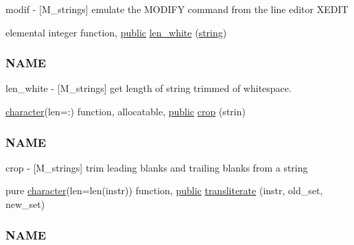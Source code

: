 \begin{DoxyCompactItemize}
\begin{DoxyCompactList}
modif -\/ \mbox{[}M\+\_\+strings\mbox{]} emulate the M\+O\+D\+I\+FY command from the line editor X\+E\+D\+IT \end{DoxyCompactList}\item 
elemental integer function, \hyperlink{M__stopwatch_83_8txt_a2f74811300c361e53b430611a7d1769f}{public} \hyperlink{namespacem__strings_aa1427d5dd673ff986236ba1732e693c1}{len\+\_\+white} (\hyperlink{what__overview_81_8txt_a74cb7e955273b9f9157b4f0c18a38849}{string})
\begin{DoxyCompactList}\small\item\em \subsubsection*{N\+A\+ME}

len\+\_\+white -\/ \mbox{[}M\+\_\+strings\mbox{]} get length of string trimmed of whitespace. \end{DoxyCompactList}\item 
\hyperlink{option__stopwatch_83_8txt_abd4b21fbbd175834027b5224bfe97e66}{character}(len=\+:) function, allocatable, \hyperlink{M__stopwatch_83_8txt_a2f74811300c361e53b430611a7d1769f}{public} \hyperlink{namespacem__strings_a7030d33ae9e65d8cf2e2cb9332ffdac0}{crop} (strin)
\begin{DoxyCompactList}\small\item\em \subsubsection*{N\+A\+ME}

crop -\/ \mbox{[}M\+\_\+strings\mbox{]} trim leading blanks and trailing blanks from a string \end{DoxyCompactList}\item 
pure \hyperlink{option__stopwatch_83_8txt_abd4b21fbbd175834027b5224bfe97e66}{character}(len=len(instr)) function, \hyperlink{M__stopwatch_83_8txt_a2f74811300c361e53b430611a7d1769f}{public} \hyperlink{namespacem__strings_aaee428861205782e002f5e7e8fb002f0}{transliterate} (instr, old\+\_\+set, new\+\_\+set)
\begin{DoxyCompactList}\small\item\em \subsubsection*{N\+A\+ME}


\end{DoxyCompactList}
\end{DoxyCompactItemize}
